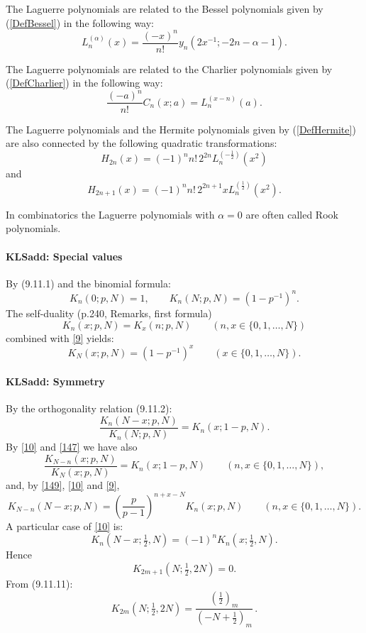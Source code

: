 \documentclass[envcountchap,graybox]{svmono}
\newcounter{rom}
\newcommand\thalf{\tfrac12}
\begin{document}
\noindent
The Laguerre polynomials are related to the Bessel polynomials given by (\ref{DefBessel})
in the following way:
$$L_n^{(\alpha)}(x)=\frac{(-x)^n}{n!}y_n(2x^{-1};-2n-\alpha-1).$$

\noindent
The Laguerre polynomials are related to the Charlier polynomials given by (\ref{DefCharlier})
in the following way:
$$\frac{(-a)^n}{n!}C_n(x;a)=L_n^{(x-n)}(a).$$

\noindent
The Laguerre polynomials and the Hermite polynomials given by (\ref{DefHermite}) are also
connected by the following quadratic transformations:
$$H_{2n}(x)=(-1)^nn!\,2^{2n}L_n^{(-\frac{1}{2})}(x^2)$$
and
$$H_{2n+1}(x)=(-1)^nn!\,2^{2n+1}xL_n^{(\frac{1}{2})}(x^2).$$

\noindent
In combinatorics the Laguerre polynomials with $\alpha=0$ are often called Rook
polynomials.
%
\paragraph{\large\bf KLSadd: Special values}By (9.11.1) and the binomial formula:
\begin{equation}
K_n(0;p,N)=1,\qquad
K_n(N;p,N)=(1-p^{-1})^n.
\label{9}
\end{equation}
The self-duality (p.240, Remarks, first formula)
\begin{equation}
K_n(x;p,N)=K_x(n;p,N)\qquad (n,x\in \{0,1,\ldots,N\})
\label{147}
\end{equation}
combined with \eqref{9} yields:
\begin{equation}
K_N(x;p,N)=(1-p^{-1})^x\qquad(x\in\{0,1,\ldots,N\}).
\label{148}
\end{equation}
%
\paragraph{\large\bf KLSadd: Symmetry}By the orthogonality relation (9.11.2):
\begin{equation}
\frac{K_n(N-x;p,N)}{K_n(N;p,N)}=K_n(x;1-p,N).
\label{10}
\end{equation}
By \eqref{10} and \eqref{147} we have also
\begin{equation}
\frac{K_{N-n}(x;p,N)}{K_N(x;p,N)}=K_n(x;1-p,N)
\qquad(n,x\in\{0,1,\ldots,N\}),
\label{149}
\end{equation}
and, by \eqref{149}, \eqref{10} and \eqref{9},
\begin{equation}
K_{N-n}(N-x;p,N)=\left(\frac p{p-1}\right)^{n+x-N}K_n(x;p,N)
\qquad(n,x\in\{0,1,\ldots,N\}).
\label{150}
\end{equation}
A particular case of \eqref{10} is:
\begin{equation}
K_n(N-x;\thalf,N)=(-1)^n K_n(x;\thalf,N).
\label{11}
\end{equation}
Hence
\begin{equation}
K_{2m+1}(N;\thalf,2N)=0.
\label{12}
\end{equation}
From (9.11.11):
\begin{equation}
K_{2m}(N;\thalf,2N)=\frac{(\thalf)_m}{(-N+\thalf)_m}\,.
\label{13}
\end{equation}
%
\end{document}
